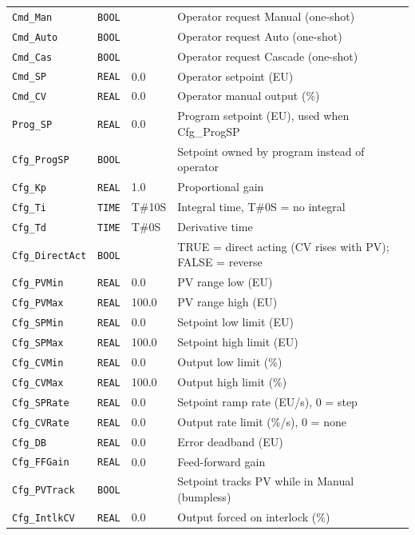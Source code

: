 \begin{small}
\begin{longtable}{@{}P{3.70cm}P{2.20cm}P{1.70cm}P{8.91cm}@{}}
\texttt{Cmd\_Man} & \texttt{BOOL} &  & Operator request Manual (one-shot) \\
\texttt{Cmd\_Auto} & \texttt{BOOL} &  & Operator request Auto (one-shot) \\
\texttt{Cmd\_Cas} & \texttt{BOOL} &  & Operator request Cascade (one-shot) \\
\texttt{Cmd\_SP} & \texttt{REAL} & 0.0 & Operator setpoint (EU) \\
\texttt{Cmd\_CV} & \texttt{REAL} & 0.0 & Operator manual output (\%) \\
\texttt{Prog\_SP} & \texttt{REAL} & 0.0 & Program setpoint (EU), used when Cfg\_ProgSP \\
\texttt{Cfg\_ProgSP} & \texttt{BOOL} &  & Setpoint owned by program instead of operator \\
\texttt{Cfg\_Kp} & \texttt{REAL} & 1.0 & Proportional gain \\
\texttt{Cfg\_Ti} & \texttt{TIME} & T\#10S & Integral time, T\#0S = no integral \\
\texttt{Cfg\_Td} & \texttt{TIME} & T\#0S & Derivative time \\
\texttt{Cfg\_DirectAct} & \texttt{BOOL} &  & TRUE = direct acting (CV rises with PV); FALSE = reverse \\
\texttt{Cfg\_PVMin} & \texttt{REAL} & 0.0 & PV range low (EU) \\
\texttt{Cfg\_PVMax} & \texttt{REAL} & 100.0 & PV range high (EU) \\
\texttt{Cfg\_SPMin} & \texttt{REAL} & 0.0 & Setpoint low limit (EU) \\
\texttt{Cfg\_SPMax} & \texttt{REAL} & 100.0 & Setpoint high limit (EU) \\
\texttt{Cfg\_CVMin} & \texttt{REAL} & 0.0 & Output low limit (\%) \\
\texttt{Cfg\_CVMax} & \texttt{REAL} & 100.0 & Output high limit (\%) \\
\texttt{Cfg\_SPRate} & \texttt{REAL} & 0.0 & Setpoint ramp rate (EU/\allowbreak{}s), 0 = step \\
\texttt{Cfg\_CVRate} & \texttt{REAL} & 0.0 & Output rate limit (\%/\allowbreak{}s), 0 = none \\
\texttt{Cfg\_DB} & \texttt{REAL} & 0.0 & Error deadband (EU) \\
\texttt{Cfg\_FFGain} & \texttt{REAL} & 0.0 & Feed-forward gain \\
\texttt{Cfg\_PVTrack} & \texttt{BOOL} &  & Setpoint tracks PV while in Manual (bumpless) \\
\texttt{Cfg\_IntlkCV} & \texttt{REAL} & 0.0 & Output forced on interlock (\%) \\

\end{longtable}
\end{small}
